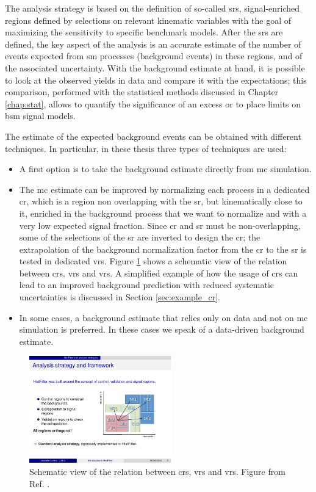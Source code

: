 The analysis strategy is based on the definition of so-called \glspl{sr}, signal-enriched regions defined by selections on relevant kinematic variables with the goal of maximizing the sensitivity to specific benchmark models. 
After the \glspl{sr} are defined, the key aspect of the analysis is an accurate estimate of the number of events expected from \gls{sm} processes (background events) in these regions, and of the associated uncertainty. 
With the background estimate at hand, it is possible to look at the observed yields in data and compare it with the expectations;
this comparison, performed with the statistical methods discussed in Chapter \ref{chap:stat}, allows to quantify the significance of an excess or to place  limits on \gls{bsm} signal models.

The estimate of the expected background events can be obtained with different techniques. In particular, in these thesis three types of techniques are used:
\begin{itemize}
\item A first option is to take the background estimate directly from \gls{mc} simulation. 
\item The \gls{mc} estimate can be improved by normalizing each process in a dedicated \gls{cr}, which is a region non overlapping with the \gls{sr}, but kinematically close to it, enriched in the background process that we want to normalize and with a very low expected signal fraction. Since \gls{cr} and \gls{sr} must be non-overlapping, some of the selections of the \gls{sr} are inverted to design the \gls{cr}; the extrapolation of the background normalization factor from the \gls{cr} to the \gls{sr} is tested in dedicated \glspl{vr}. Figure \ref{fig:susy_common:CRschema} shows a schematic view of the relation between \glspl{cr}, \glspl{vr} and \glspl{vr}. A simplified example of how the usage of \glspl{cr} can lead to an improved background prediction with reduced systematic uncertainties is discussed in Section \ref{sec:example_cr}. 
\item In some cases, a background estimate that relies only on data and not on \gls{mc} simulation is preferred. In these cases we speak of a data-driven background estimate.
\end{itemize}

\begin{figure}
\centering
\includegraphics[width=0.55\textwidth]{figures/susy_common/CR_VR}
\caption{Schematic view of the relation between \glspl{cr}, \glspl{vr} and \glspl{vr}. Figure from Ref. \cite{Baak:2014wma}.}
\label{fig:susy_common:CRschema}
\end{figure}
 
